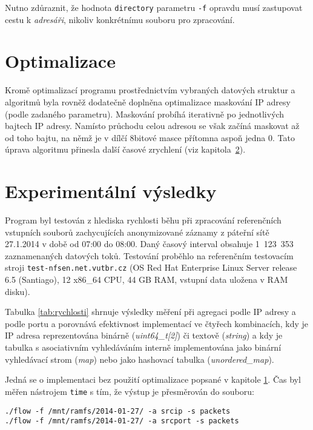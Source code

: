 \documentclass[12pt,a4paper,titlepage,final]{article}
\begin{document}
Nutno zdůraznit, že hodnota \texttt{directory} parametru \texttt{-f} opravdu musí zastupovat cestu k \emph{adresáři}, nikoliv konkrétnímu souboru pro zpracování.

\section{Optimalizace} \label{txt:optimalizace}
Kromě optimalizací programu prostřednictvím vybraných datových struktur a algoritmů byla rovněž dodatečně doplněna optimalizace maskování IP adresy (podle zadaného parametru). Maskování probíhá iterativně po jednotlivých bajtech IP adresy. Namísto průchodu celou adresou se však začíná maskovat až od toho bajtu, na němž je v dílčí 8bitové masce přítomna aspoň jedna 0. Tato úprava algoritmu přinesla další časové zrychlení (viz kapitola~\ref{txt:experimenty}).

\section{Experimentální výsledky} \label{txt:experimenty}
Program byl testován z hlediska rychlosti běhu při zpracování referenčních vstupních souborů zachycujících anonymizované záznamy z páteřní sítě\\27.1.2014 v době od 07:00 do 08:00. Daný časový interval obsahuje 1~123~353 zaznamenaných datových toků. Testování proběhlo na referenčním testovacím stroji \texttt{test-nfsen.net.vutbr.cz} (OS 
Red Hat Enterprise Linux Server release 6.5 (Santiago), 12 x86\_64 CPU, 44 GB RAM, vstupní data uložena v RAM disku).

Tabulka \ref{tab:rychlosti} shrnuje výsledky měření při agregaci podle IP adresy a podle portu a porovnává efektivnost implementací ve čtyřech kombinacích, kdy je IP adresa reprezentována binárně (\emph{uint64\_t[2]}) či textově (\emph{string}) a kdy je tabulka s asociativním vyhledáváním interně implementována jako binární vyhledávací strom (\emph{map}) nebo jako hashovací tabulka (\emph{unordered\_map}).

Jedná se o implementaci bez použití optimalizace popsané v kapitole \ref{txt:optimalizace}. Čas byl měřen nástrojem \texttt{time} s tím, že výstup je přesměrován do souboru:

\begin{verbatim}
./flow -f /mnt/ramfs/2014-01-27/ -a srcip -s packets
./flow -f /mnt/ramfs/2014-01-27/ -a srcport -s packets
\end{verbatim}
\end{document}
